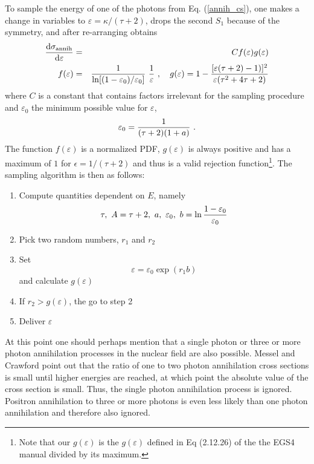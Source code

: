 To sample the energy of one of the photons from
Eq. (\ref{annih_cs}), one makes a change in variables
to $\varepsilon = \kappa/(\tau+2)$, drops the second
$S_1$ because of the symmetry, and after re-arranging obtains
\begin{eqnarray}
{{\rm d} \sigma_{\rm annih} \over {\rm d}\varepsilon} & = &
C f(\varepsilon) g(\varepsilon) \\
f(\varepsilon) & = & {1 \over \ln[(1-\varepsilon_0)/\varepsilon_0]}~
\frac{1}{\varepsilon}~, \quad
g(\varepsilon) = 1 - {[\varepsilon (\tau+2) - 1) ]^2 \over \varepsilon
(\tau^2 + 4 \tau + 2) }
\end{eqnarray}
where $C$ is a constant that contains factors irrelevant for
the sampling procedure and $\varepsilon_0$ the minimum
possible value for $\varepsilon$,
\begin{equation}
\varepsilon_0 = {1 \over (\tau+2) (1 + a)}~.
\end{equation}
The function $f(\varepsilon)$ is a normalized PDF, $g(\varepsilon)$
is always positive and
has a maximum
of $1$ for $\epsilon = 1/(\tau+2)$ and
thus is a valid rejection function\footnote{Note that our $g(\varepsilon)$ is
the $g(\varepsilon)$ defined in Eq (2.12.26) of the the EGS4 manual
divided by its maximum.}. The sampling algorithm is then as follows:
\begin{enumerate}
\item
Compute quantities dependent on $E$, namely
\begin{displaymath}
\tau,~A = \tau+2,~a,~\varepsilon_0,~
b = \ln{1 - \varepsilon_0 \over \varepsilon_0}
\end{displaymath}
\item
Pick two random numbers, $r_1$ and $r_2$
\item
Set
\begin{equation}
\varepsilon = \varepsilon_0 \exp\left(r_1 b\right)
\end{equation}
and calculate $g(\varepsilon)$
\item
If $r_2 > g(\varepsilon)$, the go to step 2
\item
Deliver $\varepsilon$
\end{enumerate}

At this point
one should perhaps mention that a single photon or three or more
photon annihilation processes in the nuclear field are also
possible. Messel and Crawford \cite{MC70} point out that
the ratio of one to two photon annihilation cross sections is small
until higher energies are reached, at which point the absolute
value of the cross section is small. Thus, the single
photon annihilation process is ignored. Positron annihilation to
three or more photons is even less likely than one photon
annihilation and therefore also ignored.

